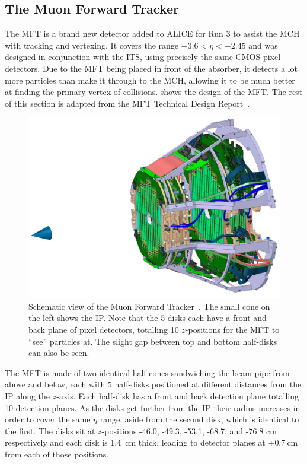 \subsection{The Muon Forward Tracker}\label{sec:MFT_Theory}
The MFT is a brand new detector added to ALICE for Run 3 to assist the MCH with tracking and vertexing. It covers the range $-3.6<\eta<-2.45$ and was designed in conjunction with the ITS, using precisely the same CMOS pixel detectors. Due to the MFT being placed in front of the absorber, it detects a lot more particles than make it through to the MCH, allowing it to be much better at finding the primary vertex of collisions.  shows the design of the MFT. The rest of this section is adapted from the MFT Technical Design Report~\cite{MFT_TDR}. 

\begin{figure}[ht]
    \begin{center}
        \includegraphics[width=.8\textwidth]{Figs/MFT_schematic.jpg}
        \caption[Schematic view of the Muon Forward Tracker]{Schematic view of the Muon Forward Tracker~\cite{MFT_Schematic}. The small cone on the left shows the IP. Note that the 5 disks each have a front and back plane of pixel detectors, totalling 10 $z$-positions for the MFT to ``see'' particles at. The slight gap between top and bottom half-disks can also be seen.}
        \label{fig:MFT Schematic}
    \end{center}
\end{figure}

The MFT is made of two identical half-cones sandwiching the beam pipe from above and below, each with 5 half-disks positioned at different distances from the IP along the $z$-axis. Each half-disk has a front and back detection plane totalling 10 detection planes. As the disks get further from the IP their radius increases in order to cover the same $\eta$ range, aside from the second disk, which is identical to the first. The disks sit at $z$-positions -46.0, -49.3, -53.1, -68.7, and -76.8 \si{\centi\metre} respectively and each disk is \SI{1.4}{\centi\metre} thick, leading to detector planes at $\pm \SI{0.7}{\centi\metre}$ from each of those positions.

